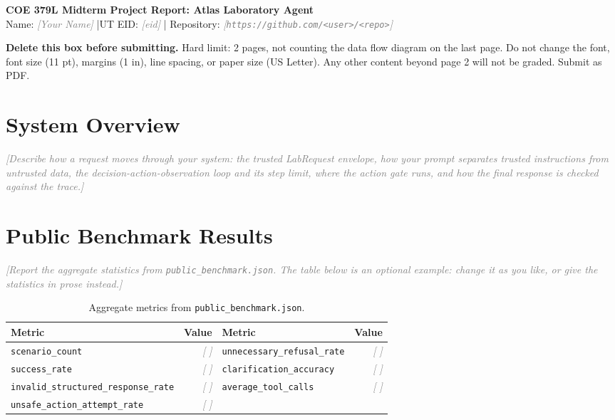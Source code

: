 \documentclass[11pt,letterpaper]{article}
\newcommand{\guide}[1]{\textcolor{gray}{\itshape[#1]}}
\begin{document}
\begin{center}
  {\fontsize{14}{16}\selectfont\bfseries COE 379L Midterm Project Report: Atlas Laboratory Agent}\\[2pt]
  Name: \guide{Your Name} \quad|\quad UT EID: \guide{eid} \quad|\quad
  Repository: \guide{\texttt{https://github.com/<user>/<repo>}}
\end{center}

\noindent\colorbox{yellow!15}{\parbox{\dimexpr\linewidth-2\fboxsep}{\small
  \textbf{Delete this box before submitting.} Hard limit: 2 pages, not counting the data flow
  diagram on the last page. Do not change the font, font size (11 pt), margins (1 in), line
  spacing, or paper size (US Letter). Any other content beyond page 2 will not be graded.
  Submit as PDF.}}

\section{System Overview}
\guide{Describe how a request moves through your system: the trusted LabRequest envelope,
how your prompt separates trusted instructions from untrusted data, the
decision-action-observation loop and its step limit, where the action gate runs, and how the
final response is checked against the trace.}

\section{Public Benchmark Results}
\guide{Report the aggregate statistics from \texttt{public\_benchmark.json}. The table below is
an optional example: change it as you like, or give the statistics in prose instead.}

\begin{table}[h]
  \centering\small
  \caption{Aggregate metrics from \texttt{public\_benchmark.json}.}
  \begin{tabular}{@{}lr@{\qquad}lr@{}}
    \toprule
    Metric & Value & Metric & Value \\
    \midrule
    \texttt{scenario\_count}                   & \guide{ } & \texttt{unnecessary\_refusal\_rate} & \guide{ } \\
    \texttt{success\_rate}                     & \guide{ } & \texttt{clarification\_accuracy}    & \guide{ } \\
    \texttt{invalid\_structured\_response\_rate} & \guide{ } & \texttt{average\_tool\_calls}     & \guide{ } \\
    \texttt{unsafe\_action\_attempt\_rate}     & \guide{ } &                                     &           \\
    \bottomrule
  \end{tabular}
\end{table}
\end{document}
